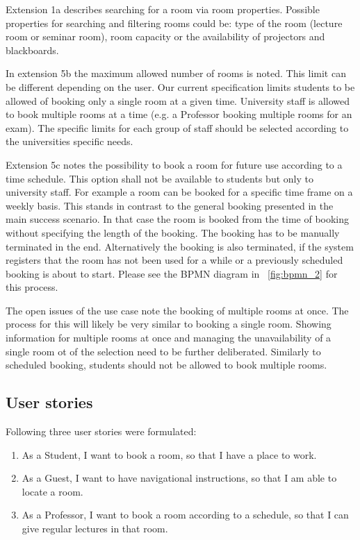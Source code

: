 \documentclass[conference,onecolumn]{IEEEtran}
\begin{document}
Extension 1a describes searching for a room via room properties.
Possible properties for searching and filtering rooms could be: type of the room (lecture room or seminar room), room capacity or the availability of projectors and blackboards.

In extension 5b the maximum allowed number of rooms is noted. This limit can be different depending on the user. Our current specification limits students to be allowed of booking only a single room at a given time. University staff is allowed to book multiple rooms at a time (e.g. a Professor booking multiple rooms for an exam). The specific limits for each group of staff should be selected according to the universities specific needs.

Extension 5c notes the possibility to book a room for future use according to a time schedule. This option shall not be available to students but only to university staff. For example a room can be booked for a specific time frame on a weekly basis.
This stands in contrast to the general booking presented in the main success scenario. In that case the room is booked from the time of booking without specifying the length of the booking. The booking has to be manually terminated in the end. Alternatively the booking is also terminated, if the system registers that the room has not been used for a while or a previously scheduled booking is about to start. Please see the BPMN diagram in \figurename~\ref{fig:bpmn_2} for this process.

The open issues of the use case note the booking of multiple rooms at once.
The process for this will likely be very similar to booking a single room. Showing information for multiple rooms at once and managing the unavailability of a single room ot of the selection need to be further deliberated. Similarly to scheduled booking, students should not be allowed to book multiple rooms.

\subsection{User stories}

Following three user stories were formulated:

\begin{enumerate}
	\item As a Student, I want to book a room, so that I have a place to work.
	\item As a Guest, I want to have navigational instructions, so that I am able to locate a room.
	\item As a Professor, I want to book a room according to a schedule, so that I can give regular lectures in that room.
\end{enumerate}
\end{document}
